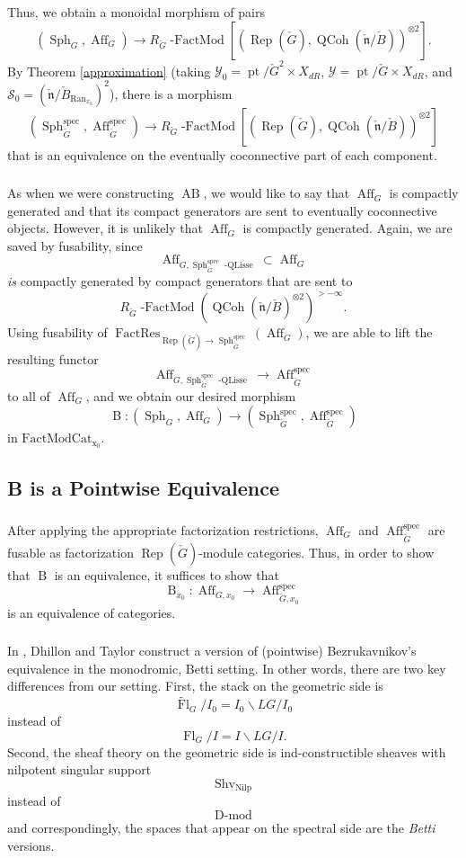 \documentclass[10pt]{amsart}
\theoremstyle{remark}
\newcommand{\on}[1]{\operatorname{#1}}
\newcommand{\Dmod}{\on{D-mod}}
\newcommand{\Gcheck}{\check{G}}
\newcommand{\ncheck}{\check{\mathfrak{n}}}
\newcommand{\Bcheck}{\check{B}}
\newcommand{\Ran}{\on{Ran}}
\newcommand{\FactModCat}{\on{FactModCat_{x_0}}}
\newcommand{\sssec}[1]{\subsubsection{}}
\begin{document}
\sssec{}
Thus, we obtain a monoidal morphism of pairs 
$$
(\on{Sph}_G, \on{Aff}_G) \to R_{\Gcheck}\on{-FactMod}[(\on{Rep}(\Gcheck), \operatorname{QCoh}(\ncheck/\Bcheck))^{\otimes 2}].
$$
By Theorem \ref{approximation} (taking $\mathcal{Y}_0 = \on{pt}/\Gcheck^2 \times X_{dR}$, $\mathcal{Y} = \on{pt}/\Gcheck \times X_{dR}$, and $\mathcal{S}_0 = (\ncheck/\Bcheck_{\Ran_{x_0}})^2$), there is a morphism
$$
(\on{Sph}_{\Gcheck}^{\on{spec}}, \on{Aff}_{\Gcheck}^{\on{spec}}) \to R_{\Gcheck}\on{-FactMod}[(\on{Rep}(\Gcheck), \operatorname{QCoh}(\ncheck/\Bcheck))^{\otimes 2}]
$$
that is an equivalence on the eventually coconnective part of each component.

\sssec{}
As when we were constructing $\on{AB}$, we would like to say that $\on{Aff}_{G}$ is compactly generated and that its compact generators are sent to eventually coconnective objects. However, it is unlikely that $\on{Aff}_{G}$ is compactly generated. Again, we are saved by fusability, since 
$$
\on{Aff}_{G, {\on{Sph}_{\Gcheck}^{\on{spec}}\on{-QLisse}}} \subset \on{Aff}_G
$$
\emph{is} compactly generated by compact generators that are sent to
$$
R_{\Gcheck}\on{-FactMod}(\operatorname{QCoh}(\ncheck/\Bcheck)^{\otimes 2})^{> -\infty}.
$$
Using fusability of $\on{FactRes}_{\on{Rep}(\Gcheck) \to \on{Sph}_{\Gcheck}^{\on{spec}}}(\on{Aff}_{G})$, we are able to lift the resulting functor
$$
\on{Aff}_{G, {\on{Sph}_{\Gcheck}^{\on{spec}}\on{-QLisse}}} \longrightarrow \on{Aff}_{\Gcheck}^{\on{spec}}
$$
to all of $\on{Aff}_{G}$, and we obtain our desired morphism
$$
\on{B} : (\on{Sph}_G, \on{Aff}_{G}) \longrightarrow (\on{Sph}_{\Gcheck}^{\on{spec}}, \on{Aff}_{\Gcheck}^{\on{spec}})
$$
in $\FactModCat$.

\subsection{B is a Pointwise Equivalence} \label{B is a Pointwise Equivalence}

\sssec{}
After applying the appropriate factorization restrictions, $\on{Aff}_G$ and $\on{Aff}_{\Gcheck}^{\on{spec}}$ are fusable as factorization $\on{Rep}(\Gcheck)$-module categories. Thus, in order to show that $\on{B}$ is an equivalence, it suffices to show that 
$$
\on{B}_{x_0} : \on{Aff}_{G, x_0} \longrightarrow \on{Aff}_{\Gcheck, x_0}^{\on{spec}}
$$ is an equivalence of categories.

\sssec{}
In \cite{DT}, Dhillon and Taylor construct a version of (pointwise) Bezrukavnikov's equivalence in the monodromic, Betti setting. In other words, there are two key differences from our setting. First, the stack on the geometric side is
$$
\tilde{\on{Fl}}_G/I_0 = I_0 \backslash LG / I_0
$$
instead of
$$
\on{Fl}_G/I = I \backslash LG/I.
$$
Second, the sheaf theory on the geometric side is ind-constructible sheaves with nilpotent singular support
$$
\on{Shv}_{\on{Nilp}}
$$
instead of
$$
\Dmod
$$
and correspondingly, the spaces that appear on the spectral side are the \emph{Betti} versions.
\end{document}

